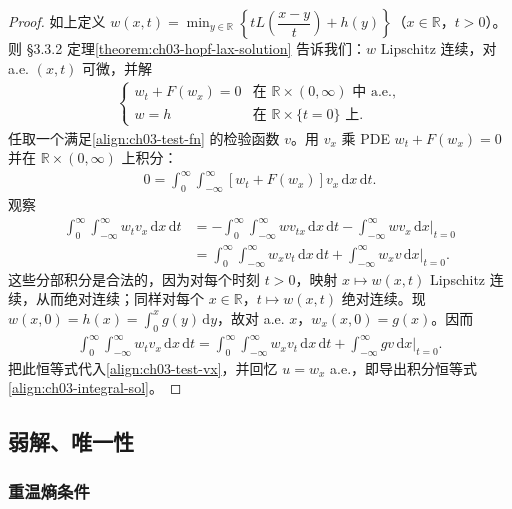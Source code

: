 \documentclass[../../main.tex]{subfiles}
\begin{document}
\begin{proof}
如上定义 $w(x,t)=\min_{y\in\mathbb{R}}\left\{tL\!\left(\dfrac{x-y}{t}\right)+h(y)\right\}$（$x\in\mathbb{R}$，$t>0$）。则 \S3.3.2 定理\cref{theorem:ch03-hopf-lax-solution} 告诉我们：$w$ Lipschitz 连续，对 a.e. $(x,t)$ 可微，并解
\begin{align}\label{align:ch03-w-ae}
\begin{cases}
w_t+F(w_x)=0 & \text{在 }\mathbb{R}\times(0,\infty)\text{ 中 a.e.},\\
w=h & \text{在 }\mathbb{R}\times\{t=0\}\text{ 上}.
\end{cases}
\end{align}
任取一个满足\eqref{align:ch03-test-fn} 的检验函数 $v$。用 $v_x$ 乘 PDE $w_t+F(w_x)=0$ 并在 $\mathbb{R}\times(0,\infty)$ 上积分：
\begin{align}\label{align:ch03-test-vx}
0=\int_0^\infty\int_{-\infty}^{\infty}[w_t+F(w_x)]v_x\,\mathrm{d}x\,\mathrm{d}t.
\end{align}
观察
\begin{align*}
\int_0^\infty\int_{-\infty}^{\infty}w_t v_x\,\mathrm{d}x\,\mathrm{d}t
&=-\int_0^\infty\int_{-\infty}^{\infty}w v_{tx}\,\mathrm{d}x\,\mathrm{d}t-\int_{-\infty}^{\infty}w v_x\,\mathrm{d}x\big|_{t=0}\\
&=\int_0^\infty\int_{-\infty}^{\infty}w_x v_t\,\mathrm{d}x\,\mathrm{d}t+\int_{-\infty}^{\infty}w_x v\,\mathrm{d}x\big|_{t=0}.
\end{align*}
这些分部积分是合法的，因为对每个时刻 $t>0$，映射 $x\mapsto w(x,t)$ Lipschitz 连续，从而绝对连续；同样对每个 $x\in\mathbb{R}$，$t\mapsto w(x,t)$ 绝对连续。现 $w(x,0)=h(x)=\int_0^x g(y)\,\mathrm{d}y$，故对 a.e. $x$，$w_x(x,0)=g(x)$。因而
\begin{align*}
\int_0^\infty\int_{-\infty}^{\infty}w_t v_x\,\mathrm{d}x\,\mathrm{d}t=\int_0^\infty\int_{-\infty}^{\infty}w_x v_t\,\mathrm{d}x\,\mathrm{d}t+\int_{-\infty}^{\infty}gv\,\mathrm{d}x\big|_{t=0}.
\end{align*}
把此恒等式代入\eqref{align:ch03-test-vx}，并回忆 $u=w_x$ a.e.，即导出积分恒等式\eqref{align:ch03-integral-sol}。
\end{proof}

\subsection{弱解、唯一性}\label{subsection:ch03-weak-unique}

\subsubsection{重温熵条件}
\end{document}
